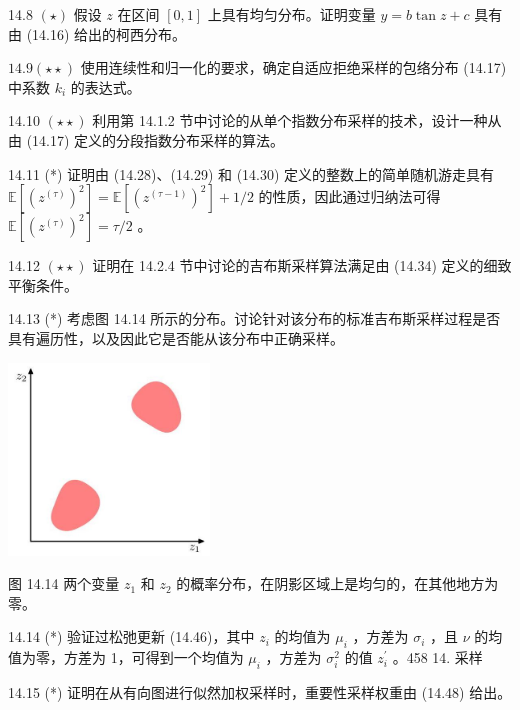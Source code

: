 \documentclass[10pt]{article}
\begin{document}
14.8 \(\left( \star \right)\) 假设 \(z\) 在区间 \(\left\lbrack  {0,1}\right\rbrack\) 上具有均匀分布。证明变量 \(y = b\tan z + c\) 具有由 (14.16) 给出的柯西分布。

\({14.9}\left( {\star  \star  }\right)\) 使用连续性和归一化的要求，确定自适应拒绝采样的包络分布 (14.17) 中系数 \({k}_{i}\) 的表达式。

14.10 \(\left( {\star  \star  }\right)\) 利用第 14.1.2 节中讨论的从单个指数分布采样的技术，设计一种从由 (14.17) 定义的分段指数分布采样的算法。

14.11 (*) 证明由 (14.28)、(14.29) 和 (14.30) 定义的整数上的简单随机游走具有 \(\mathbb{E}\left\lbrack  {\left( {z}^{\left( \tau \right) }\right) }^{2}\right\rbrack   = \mathbb{E}\left\lbrack  {\left( {z}^{\left( \tau  - 1\right) }\right) }^{2}\right\rbrack   + 1/2\) 的性质，因此通过归纳法可得 \(\mathbb{E}\left\lbrack  {\left( {z}^{\left( \tau \right) }\right) }^{2}\right\rbrack   = \tau /2\) 。

14.12 \(\left( {\star  \star  }\right)\) 证明在 14.2.4 节中讨论的吉布斯采样算法满足由 (14.34) 定义的细致平衡条件。

14.13 (*) 考虑图 14.14 所示的分布。讨论针对该分布的标准吉布斯采样过程是否具有遍历性，以及因此它是否能从该分布中正确采样。

\begin{center}
\includegraphics[max width=0.4\textwidth]{images/0194e279-9b28-703a-88f4-c3ac21e2010d_476_1015_1358_502_481_0.jpg}
\end{center}
\hspace*{3em} 

图 14.14 两个变量 \({z}_{1}\) 和 \({z}_{2}\) 的概率分布，在阴影区域上是均匀的，在其他地方为零。

14.14 (*) 验证过松弛更新 (14.46)，其中 \({z}_{i}\) 的均值为 \({\mu }_{i}\) ，方差为 \({\sigma }_{i}\) ，且 \(\nu\) 的均值为零，方差为 1，可得到一个均值为 \({\mu }_{i}\) ，方差为 \({\sigma }_{i}^{2}\) 的值 \({z}_{i}^{\prime }\) 。458 14. 采样

14.15 (*) 证明在从有向图进行似然加权采样时，重要性采样权重由 (14.48) 给出。
\end{document}
